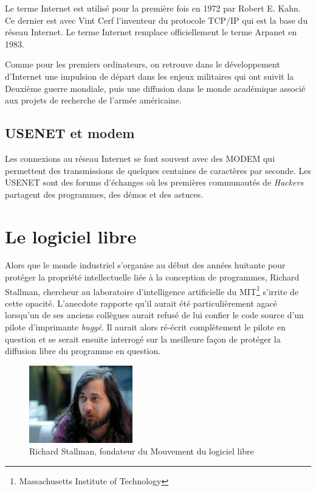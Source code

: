 \documentclass[a4paper,11pt]{book}
\begin{document}
Le terme Internet est utilisé pour la première fois en 1972 par Robert E. Kahn. Ce dernier est avec Vint Cerf l'inventeur du protocole TCP/IP qui est la base du réseau Internet. Le terme Internet remplace officiellement le terme Arpanet en 1983.

Comme pour les premiers ordinateurs, on retrouve dans le développement d'Internet une impulsion de départ dans les enjeux militaires qui ont suivit la Deuxième guerre mondiale, puis une diffusion dans le monde académique associé aux projets de recherche de l'armée américaine.

\subsection{USENET et modem}
Les connexions au réseau Internet se font souvent avec des MODEM qui permettent des transmissions de quelques centaines de caractères par seconde. Les USENET sont des forums d'échanges où les premières communautés de \textit{Hackers} partagent des programmes, des démos et des astuces.

\section{Le logiciel libre}
Alors que le monde industriel s'organise au début des années huitante pour protéger la propriété intellectuelle liée à la conception de programmes, Richard Stallman, chercheur au laboratoire d'intelligence artificielle du MIT\footnote{Massachusetts Institute of Technology} s'irrite de cette opacité. L'anecdote rapporte qu'il aurait été particulièrement agacé lorsqu'un de ses anciens collègues aurait refusé de lui confier le code source d'un pilote d'imprimante \textit{buggé}. Il aurait alors ré-écrit complètement le pilote en question et se serait ensuite interrogé sur la meilleure façon de protéger la diffusion libre du programme en question. 

\begin{figure}[h]
    \centering
    \includegraphics[width=0.4\textwidth]{media/portraits/440px-Richard_Matthew_Stallman.jpeg}
    \caption{Richard Stallman, fondateur du Mouvement du logiciel libre}
    \label{stallman}
\end{figure}
\end{document}
